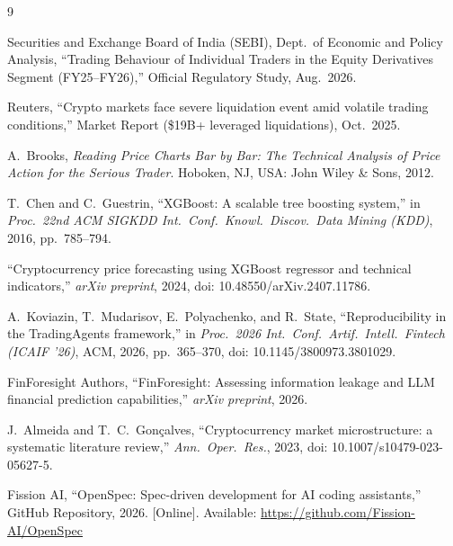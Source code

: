 \documentclass[conference]{IEEEtran}
\begin{document}
\begin{thebibliography}{9}

Securities and Exchange Board of India (SEBI), Dept.\ of Economic and Policy Analysis, ``Trading Behaviour of Individual Traders in the Equity Derivatives Segment (FY25--FY26),'' Official Regulatory Study, Aug.\ 2026.

Reuters, ``Crypto markets face severe liquidation event amid volatile trading conditions,'' Market Report (\$19B+ leveraged liquidations), Oct.\ 2025.

A.~Brooks, \textit{Reading Price Charts Bar by Bar: The Technical Analysis of Price Action for the Serious Trader}. Hoboken, NJ, USA: John Wiley \& Sons, 2012.

T.~Chen and C.~Guestrin, ``XGBoost: A scalable tree boosting system,'' in \textit{Proc.\ 22nd ACM SIGKDD Int.\ Conf.\ Knowl.\ Discov.\ Data Mining (KDD)}, 2016, pp.\ 785--794.

``Cryptocurrency price forecasting using XGBoost regressor and technical indicators,'' \textit{arXiv preprint}, 2024, doi: 10.48550/arXiv.2407.11786.

A.~Koviazin, T.~Mudarisov, E.~Polyachenko, and R.~State, ``Reproducibility in the TradingAgents framework,'' in \textit{Proc.\ 2026 Int.\ Conf.\ Artif.\ Intell.\ Fintech (ICAIF '26)}, ACM, 2026, pp.\ 365--370, doi: 10.1145/3800973.3801029.

FinForesight Authors, ``FinForesight: Assessing information leakage and LLM financial prediction capabilities,'' \textit{arXiv preprint}, 2026.

J.~Almeida and T.~C.~Gon\c{c}alves, ``Cryptocurrency market microstructure: a systematic literature review,'' \textit{Ann.\ Oper.\ Res.}, 2023, doi: 10.1007/s10479-023-05627-5.

Fission AI, ``OpenSpec: Spec-driven development for AI coding assistants,'' GitHub Repository, 2026. [Online]. Available: \url{https://github.com/Fission-AI/OpenSpec}

\end{thebibliography}
\end{document}
